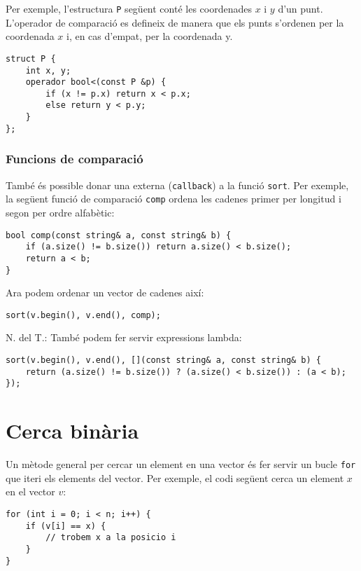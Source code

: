 Per exemple, l'estructura \texttt{P} següent
conté les coordenades $x$ i $y$ d'un punt.
L'operador de comparació es defineix de manera que
els punts s'ordenen per la coordenada $x$
i, en cas d'empat, per la coordenada y.

\begin{lstlisting}
struct P {
    int x, y;
    operador bool<(const P &p) {
        if (x != p.x) return x < p.x;
        else return y < p.y;
    }
};
\end{lstlisting}

\subsubsection{Funcions de comparació}


També és possible donar una
 externa (\texttt{callback}) a la funció
\texttt{sort}. 
Per exemple, la següent funció de comparació \texttt{comp}
ordena les cadenes primer per longitud i segon per ordre alfabètic:

\begin{lstlisting}
bool comp(const string& a, const string& b) {
    if (a.size() != b.size()) return a.size() < b.size();
    return a < b;
}
\end{lstlisting}
Ara podem ordenar un vector de cadenes així:
\begin{lstlisting}
sort(v.begin(), v.end(), comp);
\end{lstlisting}

N. del T.: També podem fer servir expressions lambda:
\begin{lstlisting}
sort(v.begin(), v.end(), [](const string& a, const string& b) {
    return (a.size() != b.size()) ? (a.size() < b.size()) : (a < b);
});
\end{lstlisting}

\section{Cerca binària}


Un mètode general per cercar un element
en una vector és fer servir un bucle \texttt{for}
que iteri els elements del vector.
Per exemple, el codi següent cerca
un element $x$ en el vector $v$:

\begin{lstlisting}
for (int i = 0; i < n; i++) {
    if (v[i] == x) {
        // trobem x a la posicio i
    }
}
\end{lstlisting}

